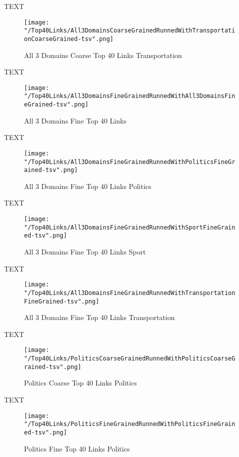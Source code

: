 \documentclass[thesis=M,english]{FITthesis}[2012/10/20]
\begin{document}
		TEXT	

	\begin{figure}\centering
		\texttt{[image: "/Top40Links/All3DomainsCoarseGrainedRunnedWithTransportationCoarseGrained-tsv".png]}
		\caption{All 3 Domains Coarse Top 40 Links Transportation}\label{}	
	\end{figure}
		
		TEXT	

	\begin{figure}\centering
		\texttt{[image: "/Top40Links/All3DomainsFineGrainedRunnedWithAll3DomainsFineGrained-tsv".png]}
		\caption{All 3 Domains Fine Top 40 Links }\label{}	
	\end{figure}
	
	TEXT

	\begin{figure}\centering
		\texttt{[image: "/Top40Links/All3DomainsFineGrainedRunnedWithPoliticsFineGrained-tsv".png]}
		\caption{All 3 Domains Fine Top 40 Links Politics}\label{}
	\end{figure}	

	TEXT	

	\begin{figure}\centering
		\texttt{[image: "/Top40Links/All3DomainsFineGrainedRunnedWithSportFineGrained-tsv".png]}
		\caption{All 3 Domains Fine Top 40 Links Sport}\label{}
	\end{figure}
	
		TEXT	

	\begin{figure}\centering
		\texttt{[image: "/Top40Links/All3DomainsFineGrainedRunnedWithTransportationFineGrained-tsv".png]}
		\caption{All 3 Domains Fine Top 40 Links Transportation}\label{}	
	\end{figure}
	
	TEXT

	\begin{figure}\centering
		\texttt{[image: "/Top40Links/PoliticsCoarseGrainedRunnedWithPoliticsCoarseGrained-tsv".png]}
		\caption{Politics Coarse Top 40 Links Politics}\label{}
	\end{figure}	

	TEXT	

	\begin{figure}\centering
		\texttt{[image: "/Top40Links/PoliticsFineGrainedRunnedWithPoliticsFineGrained-tsv".png]}
		\caption{Politics Fine Top 40 Links Politics}\label{}
	\end{figure}
\end{document}
